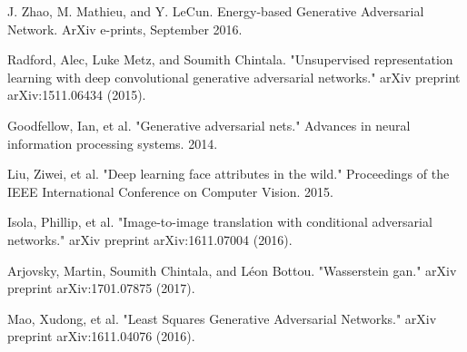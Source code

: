 \documentclass[11pt]{article}
\begin{document}
\noindent [2] J. Zhao, M. Mathieu, and Y. LeCun.  Energy-based Generative Adversarial 
Network. ArXiv e-prints, September 2016.
\vspace{2pt}

\noindent [3] Radford, Alec, Luke Metz, and Soumith Chintala. "Unsupervised representation learning with deep
convolutional generative adversarial networks." arXiv preprint arXiv:1511.06434 (2015).

\noindent [4] Goodfellow, Ian, et al. "Generative adversarial nets." Advances in neural information processing systems. 2014.

\noindent [5] Liu, Ziwei, et al. "Deep learning face attributes in the wild." Proceedings of the IEEE International Conference on Computer Vision. 2015.

\noindent [6] Isola, Phillip, et al. "Image-to-image translation with conditional adversarial networks." arXiv preprint arXiv:1611.07004 (2016).

\noindent [7] Arjovsky, Martin, Soumith Chintala, and Léon Bottou. "Wasserstein gan." arXiv preprint arXiv:1701.07875 (2017).

\noindent [8] Mao, Xudong, et al. "Least Squares Generative Adversarial Networks." arXiv preprint arXiv:1611.04076 (2016).
\end{document}
